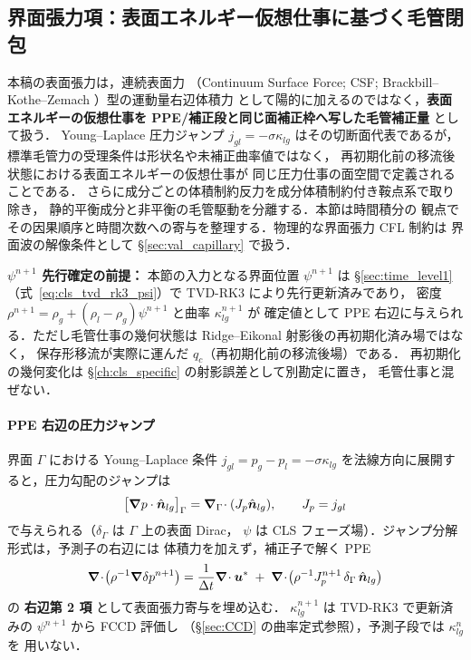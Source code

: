 \subsection{界面張力項：表面エネルギー仮想仕事に基づく毛管閉包}
\label{sec:time_csf}

本稿の表面張力は，連続表面力
（Continuum Surface Force; CSF; Brackbill--Kothe--Zemach \cite{Brackbill1992}）型の運動量右辺体積力
として陽的に加えるのではなく，\textbf{表面エネルギーの仮想仕事を
PPE/補正段と同じ面補正枠へ写した毛管補正量} として扱う．
Young--Laplace 圧力ジャンプ $j_{gl}=-\sigma\kappa_{lg}$ はその切断面代表であるが，
標準毛管力の受理条件は形状名や未補正曲率値ではなく，
再初期化前の移流後状態における表面エネルギーの仮想仕事が
同じ圧力仕事の面空間で定義されることである．
さらに成分ごとの体積制約反力を成分体積制約付き鞍点系で取り除き，
静的平衡成分と非平衡の毛管駆動を分離する．本節は時間積分の
観点でその因果順序と時間次数への寄与を整理する．物理的な界面張力 CFL 制約は
界面波の解像条件として §\ref{sec:val_capillary} で扱う．

\noindent\textbf{$\psi^{n+1}$ 先行確定の前提：}
本節の入力となる界面位置 $\psi^{n+1}$ は §\ref{sec:time_level1}
（式~\eqref{eq:cls_tvd_rk3_psi}）で TVD-RK3 により先行更新済みであり，
密度 $\rho^{n+1}=\rho_g+(\rho_l-\rho_g)\psi^{n+1}$ と曲率 $\kappa_{lg}^{n+1}$ が
確定値として PPE 右辺に与えられる．ただし毛管仕事の幾何状態は
Ridge--Eikonal 射影後の再初期化済み場ではなく，
保存形移流が実際に運んだ $q_c$（再初期化前の移流後場）である．
再初期化の幾何変化は §\ref{ch:cls_specific} の射影誤差として別勘定に置き，
毛管仕事と混ぜない．

\paragraph{PPE 右辺の圧力ジャンプ}
界面 $\Gamma$ における Young--Laplace 条件 $j_{gl}=p_g-p_l=-\sigma\kappa_{lg}$
を法線方向に展開すると，圧力勾配のジャンプは
\begin{equation}
  \bigl[\bm{\nabla} p\cdot\hat{\bm n}_{lg}\bigr]_\Gamma
  = \bm{\nabla}_\Gamma\!\cdot(J_p\hat{\bm n}_{lg}),
  \qquad J_p=j_{gl}
  \label{eq:pressure_jump_csf}
\end{equation}
で与えられる（$\delta_\Gamma$ は $\Gamma$ 上の表面 Dirac，
$\psi$ は CLS フェーズ場）．ジャンプ分解形式は，予測子の右辺には
体積力を加えず，補正子で解く PPE
\begin{equation}
  \bm{\nabla}\!\cdot\!\bigl(\rho^{-1}\bm{\nabla}\delta p^{n+1}\bigr)
  = \frac{1}{\Delta t}\bm{\nabla}\!\cdot \bm{u}^{*}
  \;+\;\bm{\nabla}\!\cdot\!\bigl(\rho^{-1}J_p^{n+1}\,\delta_\Gamma\,\hat{\bm n}_{lg}\bigr)
  \label{eq:ppe_jump_decomposed}
\end{equation}
の \textbf{右辺第 2 項} として表面張力寄与を埋め込む．
$\kappa_{lg}^{n+1}$ は TVD-RK3 で更新済みの $\psi^{n+1}$ から FCCD 評価し
（§\ref{sec:CCD} の曲率定式参照），予測子段では $\kappa_{lg}^{n}$ を
用いない．

